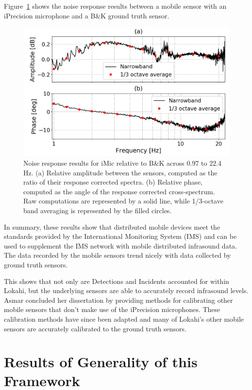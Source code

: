 Figure~\ref{fig:asmar_3} shows the noise response results between a mobile sensor with an iPrecision microphone and a B\&K ground truth sensor.

\begin{figure}[H]
    \centering
    \includegraphics[width=\linewidth]{figures/asmar_3.png}
    \caption{Noise response results for iMic relative to B\&K across 0.97 to 22.4 Hz. (a) Relative amplitude between the sensors, computed as the ratio of their response corrected spectra. (b) Relative phase, computed as the angle of the response corrected cross-spectrum. Raw computations are represented by a solid line, while 1/3-octave band averaging is represented by the filled circles.}
    \label{fig:asmar_3}
\end{figure}

In summary, these results show that distributed mobile devices meet the standards provided by the International Monitoring System (IMS) and can be used to supplement the IMS network with mobile distributed infrasound data. The data recorded by the mobile sensors trend nicely with data collected by ground truth sensors.

This shows that not only are Detections and Incidents accounted for within Lokahi, but the underlying sensors are able to accurately record infrasound levels. Asmar concluded her dissertation by providing methods for calibrating other mobile sensors that don't make use of the iPrecision microphones. These calibration methods have since been adapted and many of Lokahi's other mobile sensors are accurately calibrated to the ground truth sensors.

\section{Results of Generality of this Framework}\label{sec:results-of-generality-of-this-framework}

